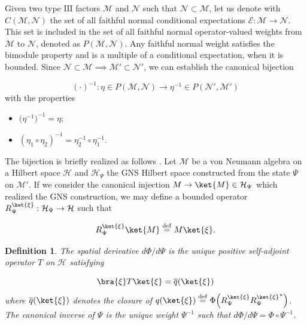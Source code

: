 \documentclass[a4paper,11pt]{article}
\newcommand{\eqdef}{\overset{\mathrm{def}}{=}}
\newtheorem{Definition}{Definition}[subsection]
\begin{document}
Given two type $\mathrm{III}$ factors $\mathcal{M}$ and $\mathcal{N}$ such that $\mathcal{N} \subset \mathcal{M}$, let us denote with $C(\mathcal{M}, \mathcal{N})$ the set of all faithful normal conditional expectations $\mathcal{E}: \mathcal{M} \rightarrow \mathcal{N}$. This set is included in the set of all faithful normal operator-valued weights from $\mathcal{M}$ to $\mathcal{N}$, denoted as $P(\mathcal{M}, \mathcal{N})$. Any faithful normal weight satisfies the bimodule property and is a multiple of a conditional expectation, when it is bounded. Since $\mathcal{N} \subset \mathcal{M} \implies \mathcal{M}' \subset \mathcal{N}'$, we can establish the canonical bijection

\begin{equation}
    (\cdot)^{-1} : \eta \in P(\mathcal{M}, \mathcal{N}) \rightarrow \eta^{-1} \in P(\mathcal{N}', \mathcal{M}')
\end{equation}
%
with the properties

\begin{itemize}
    \item $\big( \eta^{-1} \big)^{-1} = \eta$;
    \item $(\eta_1 \circ \eta_2)^{-1} = \eta_2^{-1} \circ \eta_1^{-1}$.
\end{itemize}
%
The bijection is briefly realized as follows \cite{Connes}. Let $\mathcal{M}$ be a von Neumann algebra on a Hilbert space $\mathcal{H}$ and $\mathcal{H}_{\Psi}$ the GNS Hilbert space constructed from the state $\Psi$ on $\mathcal{M}'$. If we consider the canonical injection $M \rightarrow \ket{M} \in \mathcal{H}_{\Psi}$ which realized the GNS construction, we may define a bounded operator $R_{\Psi}^{\ket{\xi}}: \mathcal{H}_{\Psi} \rightarrow \mathcal{H}$ such that

\begin{equation}
    R_{\Psi}^{\ket{\xi}} \ket{M} \eqdef M \ket{\xi} \text{.}
\end{equation}

\begin{Definition}
    The \textnormal{spatial derivative} $d\Phi/d\Psi$ is the unique positive self-adjoint operator $T$ on $\mathcal{H}$ satisfying

    \begin{equation}
        \bra{\xi} T \ket{\xi} = \overline{q}(\ket{\xi}) 
    \end{equation}
    where $\overline{q}(\ket{\xi})$ denotes the closure of $q(\ket{\xi}) \eqdef \Phi \Big( R_{\Psi}^{\ket{\xi}} {R_{\Psi}^{\ket{\xi}}}^* \Big)$.
    The \textnormal{canonical inverse} of $\Psi$ is the unique weight $\Psi^{-1}$ such that $d\Phi/d\Psi = \Phi \circ \Psi^{-1}$.
\end{Definition}
\end{document}
